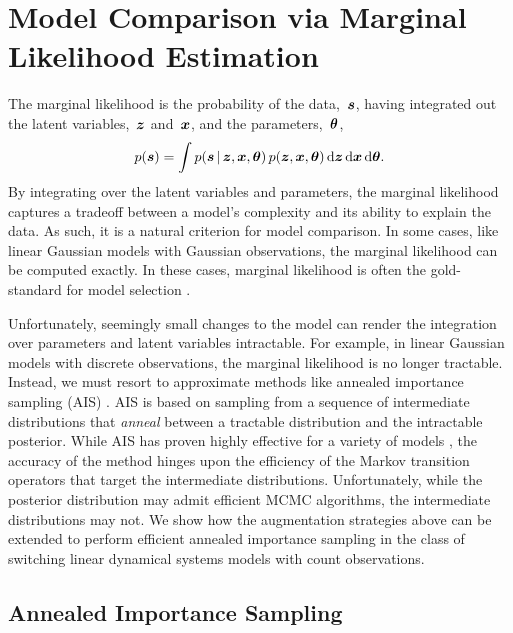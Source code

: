 \section{Model Comparison via Marginal Likelihood Estimation}
The marginal likelihood is the probability of the
data,~$\boldsymbol{s}$, having integrated out the latent
variables,~$\boldsymbol{z}$ and~$\boldsymbol{x}$, and the parameters,~$\boldsymbol{\theta}$,
\begin{align*}
  p(\boldsymbol{s}) = \int p(\boldsymbol{s} \,|\, \boldsymbol{z}, \boldsymbol{x}, \boldsymbol{\theta}) \, 
  p(\boldsymbol{z}, \boldsymbol{x}, \boldsymbol{\theta}) \, \mathrm{d} \boldsymbol{z} \, \mathrm{d}\boldsymbol{x} \, \mathrm{d}\boldsymbol{\theta}.
\end{align*}
By integrating over the latent variables and parameters, the marginal
likelihood captures a tradeoff between a model's complexity and its
ability to explain the data.  As such, it is a natural criterion for
model comparison. In some cases, like linear Gaussian models with Gaussian observations,
 the marginal likelihood can be computed exactly. 
In these cases, marginal likelihood is often the gold-standard 
for model selection \citep{kass1995bayes, grosse2015sandwiching}.

Unfortunately, seemingly small changes to the model can render the
integration over parameters and latent variables intractable.  For
example, in linear Gaussian models with discrete observations, the
marginal likelihood is no longer tractable.  Instead, we must resort
to approximate methods like annealed importance sampling (AIS)
\citep{neal2001annealed}.  AIS is based on sampling from a sequence of
intermediate distributions that \emph{anneal} between a tractable
distribution and the intractable posterior. While AIS has proven
highly effective for a variety of models
\citep{grosse2015sandwiching}, the accuracy of the method hinges upon
the efficiency of the Markov transition operators that target the
intermediate distributions.  Unfortunately, while the posterior 
distribution may admit efficient MCMC algorithms, the intermediate 
distributions may not. We show how the \polyagamma
augmentation strategies above can be extended to perform efficient
annealed importance sampling in the class of switching linear
dynamical systems models with count observations.

\subsection{Annealed Importance Sampling}

